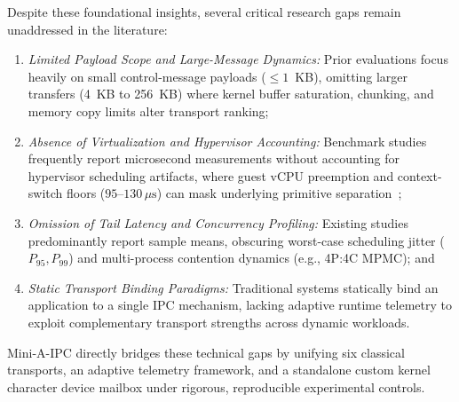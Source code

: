 Despite these foundational insights, several critical research gaps remain unaddressed in the literature:
\begin{enumerate}[leftmargin=*,noitemsep,topsep=1.5pt]
    \item \textit{Limited Payload Scope and Large-Message Dynamics:} Prior evaluations focus heavily on small control-message payloads ($\le 1$~KB), omitting larger transfers (4~KB to 256~KB) where kernel buffer saturation, chunking, and memory copy limits alter transport ranking;
    \item \textit{Absence of Virtualization and Hypervisor Accounting:} Benchmark studies frequently report microsecond measurements without accounting for hypervisor scheduling artifacts, where guest vCPU preemption and context-switch floors ($95\text{--}130\,\mu\text{s}$) can mask underlying primitive separation~\cite{gregg2020systems};
    \item \textit{Omission of Tail Latency and Concurrency Profiling:} Existing studies predominantly report sample means, obscuring worst-case scheduling jitter ($P_{95}, P_{99}$) and multi-process contention dynamics (e.g., 4P:4C MPMC); and
    \item \textit{Static Transport Binding Paradigms:} Traditional systems statically bind an application to a single IPC mechanism, lacking adaptive runtime telemetry to exploit complementary transport strengths across dynamic workloads.
\end{enumerate}

Mini-A-IPC directly bridges these technical gaps by unifying six classical transports, an adaptive telemetry framework, and a standalone custom kernel character device mailbox under rigorous, reproducible experimental controls.
